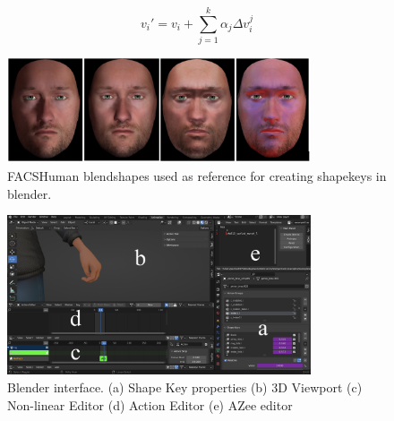 \documentclass[../../main]{subfiles}
\begin{document}
\[
v_i' = v_i + \sum_{j=1}^{k} \alpha_j \Delta v_i^j
\]

\begin{figure}[h]
    \centering
    \includegraphics[width=0.8\textwidth]{chapters/facial_expressions/images/facshuman_blendshapes.png}
    \caption{FACSHuman blendshapes used as reference for creating shapekeys in blender.}
    \label{ch:facial_expressions:fig:facshuman_blendshapes}
\end{figure}

\begin{figure}[h]
    \centering
    \includegraphics[width=0.8\textwidth]{chapters/facial_expressions/images/shape_keys.png}
    \caption{Blender interface. (a) Shape Key properties (b) 3D Viewport (c) Non-linear Editor (d) Action Editor (e) AZee editor}
    \label{ch:facial_expressions:fig:shape_keys}
\end{figure}
\end{document}
